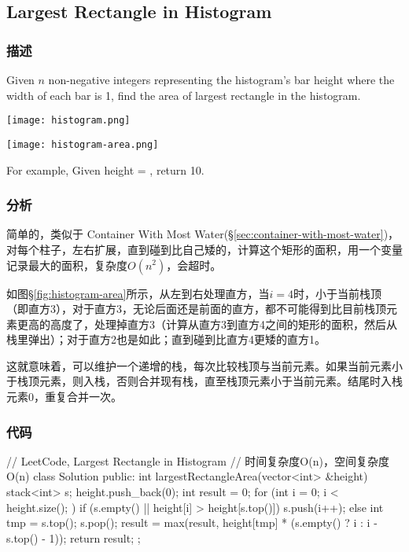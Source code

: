 \subsection{Largest Rectangle in Histogram} %
\label{sec:largest-rectangle-in-histogram}


\subsubsection{描述}
Given $n$ non-negative integers representing the histogram's bar height where the width of each bar is 1, find the area of largest rectangle in the histogram.

\begin{center}
\texttt{[image: histogram.png]}\\
\label{fig:histogram}
\end{center}

\begin{center}
\texttt{[image: histogram-area.png]}\\
\label{fig:histogram-area}
\end{center}

For example,
Given height = \fn{[2,1,5,6,2,3]},
return 10.


\subsubsection{分析}
简单的，类似于 Container With Most Water(\S \ref{sec:container-with-most-water})，对每个柱子，左右扩展，直到碰到比自己矮的，计算这个矩形的面积，用一个变量记录最大的面积，复杂度$O(n^2)$，会超时。

如图\S \ref{fig:histogram-area}所示，从左到右处理直方，当$i=4$时，小于当前栈顶（即直方3），对于直方3，无论后面还是前面的直方，都不可能得到比目前栈顶元素更高的高度了，处理掉直方3（计算从直方3到直方4之间的矩形的面积，然后从栈里弹出）；对于直方2也是如此；直到碰到比直方4更矮的直方1。

这就意味着，可以维护一个递增的栈，每次比较栈顶与当前元素。如果当前元素小于栈顶元素，则入栈，否则合并现有栈，直至栈顶元素小于当前元素。结尾时入栈元素0，重复合并一次。


\subsubsection{代码}
\begin{Code}
// LeetCode, Largest Rectangle in Histogram
// 时间复杂度O(n)，空间复杂度O(n)
class Solution {
public:
    int largestRectangleArea(vector<int> &height) {
        stack<int> s;
        height.push_back(0);
        int result = 0;
        for (int i = 0; i < height.size(); ) {
            if (s.empty() || height[i] > height[s.top()])
                s.push(i++);
            else {
                int tmp = s.top();
                s.pop();
                result = max(result,
                        height[tmp] * (s.empty() ? i : i - s.top() - 1));
            }
        }
        return result;
    }
};
\end{Code}


